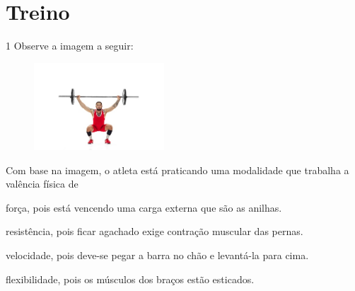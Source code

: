 

\section{Treino}

\num{1} Observe a imagem a seguir:

\begin{figure}[htpb!]
\includegraphics[width=1.92222in,height=1.28367in]{./imgs/img2.jpg}
\end{figure}

Com base na imagem, o atleta está praticando uma modalidade que trabalha
a valência física de

\begin{escolha}
\item força, pois está vencendo uma carga externa que são as anilhas.

\item resistência, pois ficar agachado exige contração muscular das pernas.

\item velocidade, pois deve-se pegar a barra no chão e levantá-la para
cima.

\item flexibilidade, pois os músculos dos braços estão esticados.
\end{escolha}


